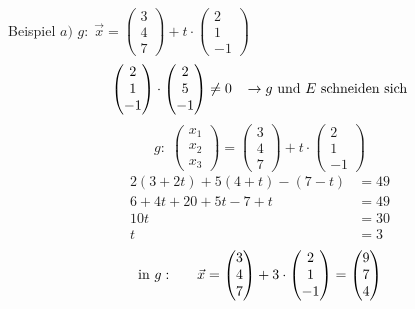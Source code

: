 \documentclass{article}
\begin{document}
\begin{boxx}[DarkBlue]{Beispiel}
    $a)$\hspace{3mm} $g:\; \vec{x} = \begin{pmatrix}3\\4\\7\end{pmatrix} + t\cdot \begin{pmatrix}2\\1\\-1\end{pmatrix}$
    \begin{align*}
        \begin{pmatrix}2\\1\\-1\end{pmatrix} \cdot \begin{pmatrix}2\\5\\-1\end{pmatrix} \not = 0 \hspace*{3mm} \rightarrow \text{$g$ und $E$ schneiden sich}
    \end{align*}
    \[g:\; \begin{pmatrix}x_1\\x_2\\x_3\end{pmatrix} = \begin{pmatrix}3\\4\\7\end{pmatrix} + t\cdot \begin{pmatrix}2\\1\\-1\end{pmatrix}\]
    \begin{align*}
        2(3+2t) + 5(4+t) - (7-t) &= 49 \\
        6 +4t + 20 +5t -7 +t &= 49 \\
        10 t &= 30 \\
        t &= 3
    \end{align*}
    \begin{align*}
        \text{in }g: \hspace*{6mm} \vec{x} = \begin{pmatrix}3\\4\\7\end{pmatrix} + 3 \cdot \begin{pmatrix}2\\1\\-1\end{pmatrix} = \begin{pmatrix}9\\7\\4\end{pmatrix}

\end{align*}
\end{boxx}
\end{document}
